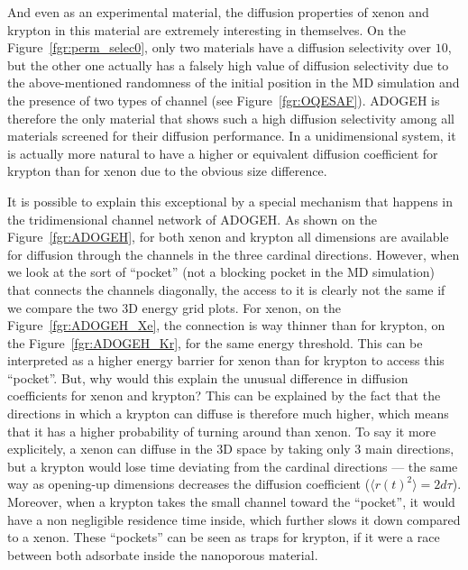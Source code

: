 \documentclass[main]{subfiles}
\begin{document}
And even as an experimental material, the diffusion properties of xenon and krypton in this material are extremely interesting in themselves. On the Figure~\ref{fgr:perm_selec0}, only two materials have a diffusion selectivity over $10$, but the other one actually has a falsely high value of diffusion selectivity due to the above-mentioned randomness of the initial position in the MD simulation and the presence of two types of channel (see Figure~\ref{fgr:OQESAF}). ADOGEH is therefore the only material that shows such a high diffusion selectivity among all materials screened for their diffusion performance. In a unidimensional system, it is actually more natural to have a higher or equivalent diffusion coefficient for krypton than for xenon due to the obvious size difference. 

It is possible to explain this exceptional by a special mechanism that happens in the tridimensional channel network of ADOGEH. As shown on the Figure~\ref{fgr:ADOGEH}, for both xenon and krypton all dimensions are available for diffusion through the channels in the three cardinal directions. However, when we look at the sort of ``pocket'' (not a blocking pocket in the MD simulation) that connects the channels diagonally, the access to it is clearly not the same if we compare the two 3D energy grid plots. For xenon, on the Figure~\ref{fgr:ADOGEH_Xe}, the connection is way thinner than for krypton, on the Figure~\ref{fgr:ADOGEH_Kr}, for the same energy threshold. This can be interpreted as a higher energy barrier for xenon than for krypton to access this ``pocket''. But, why would this explain the unusual difference in diffusion coefficients for xenon and krypton? This can be explained by the fact that the directions in which a krypton can diffuse is therefore much higher, which means that it has a higher probability of turning around than xenon. To say it more explicitely, a xenon can diffuse in the 3D space by taking only 3 main directions, but a krypton would lose time deviating from the cardinal directions --- the same way as opening-up dimensions decreases the diffusion coefficient ($\langle{r(t)}^2\rangle=2d\tau$). Moreover, when a krypton takes the small channel toward the ``pocket'', it would have a non negligible residence time inside, which further slows it down compared to a xenon. These ``pockets'' can be seen as traps for krypton, if it were a race between both adsorbate inside the nanoporous material. 
\end{document}

